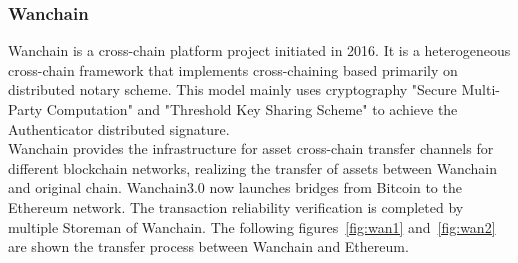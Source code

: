 \subsubsection{Wanchain}
\noindent Wanchain\cite{wanchain.org} is a cross-chain platform project initiated in 2016. It is a heterogeneous cross-chain framework that implements cross-chaining based primarily on distributed notary scheme. This model mainly uses cryptography "Secure Multi-Party Computation" and "Threshold Key Sharing Scheme" to achieve the Authenticator distributed signature.\\

\noindent Wanchain provides the infrastructure for asset cross-chain transfer channels for different blockchain networks, realizing the transfer of assets between Wanchain and original chain. Wanchain3.0 now launches bridges from Bitcoin to the Ethereum network. The transaction reliability verification is completed by multiple Storeman of Wanchain. The following figures~\ref{fig:wan1} and~\ref{fig:wan2} are shown the transfer process between Wanchain and Ethereum.

